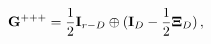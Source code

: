 \begin{equation}
\label{very} {\bf G^{+++}}=\frac{1}{2}{\bf I}_{r-D} \oplus ({\bf I}_D -
\frac{1}{2}{\bf\Xi}_D)\, ,
\end{equation} 
